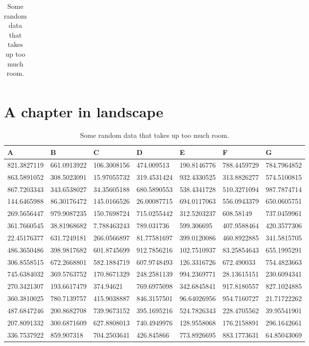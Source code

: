\documentclass[lscape]{msu-thesis}
\begin{document}
\begin{landscape}
\begin{table}
\begin{tabular}{lllllll}
\bottomrule
\end{tabular}

\caption{Some random data that takes up too much room.}
\end{table}

\chapter{A chapter in landscape}

\begin{table}[htbp]
\centering
\begin{tabular}{lllllll}

\toprule
A & B & C & D & E & F & G \\
\midrule
821.3827119 & 661.0913922 & 106.3008156 & 474.009513 & 190.8146776 & 788.4459729 & 784.7964852 \\
863.5891052 & 308.5023091 & 15.97055732 & 319.4531424 & 932.4330525 & 313.8826277 & 574.5100815 \\
867.7203343 & 343.6538027 & 34.35605188 & 680.5890553 & 538.4341728 & 510.3271094 & 987.7874714 \\
144.6465988 & 86.30176472 & 145.0166526 & 26.00087715 & 694.0117063 & 556.0943379 & 650.0605751 \\
269.5656447 & 979.9087235 & 150.7698724 & 715.0255442 & 312.5203237 & 608.58149 & 737.0459961 \\
361.7660545 & 38.81968682 & 7.788463243 & 789.031736 & 599.306695 & 407.9588464 & 420.3577306 \\
22.45176377 & 631.7249181 & 266.0566897 & 81.77581697 & 399.0120086 & 460.8922885 & 341.5815705 \\
486.3650486 & 398.9817682 & 601.8745699 & 912.7856216 & 102.7510937 & 83.25854643 & 655.1995291 \\
306.8558515 & 672.2668801 & 582.1884719 & 607.9748493 & 126.3316726 & 672.490033 & 754.4823663 \\
745.6384032 & 369.5763752 & 170.8671329 & 248.2581139 & 994.2369771 & 28.13615151 & 230.6094341 \\
270.3421307 & 193.6617479 & 374.94621 & 769.6975098 & 342.6845841 & 917.8180557 & 827.1024885 \\
360.3810025 & 780.7139757 & 415.9038887 & 846.3157501 & 96.64026956 & 954.7160727 & 21.71722262 \\
487.6847246 & 200.8682708 & 739.9673152 & 395.1695216 & 524.7826343 & 228.4705562 & 39.95541901 \\
207.8091332 & 300.6871609 & 627.8808013 & 740.4949976 & 128.9558068 & 176.2158891 & 296.1642661 \\
336.7537922 & 859.907318 & 704.2503641 & 426.845866 & 773.8926695 & 883.1773631 & 64.85043069 \\

\bottomrule
\end{tabular}

\caption{Some random data that takes up too much room.}
\end{table}
\end{landscape}
\pagestyle{plain}
%
\end{document}

